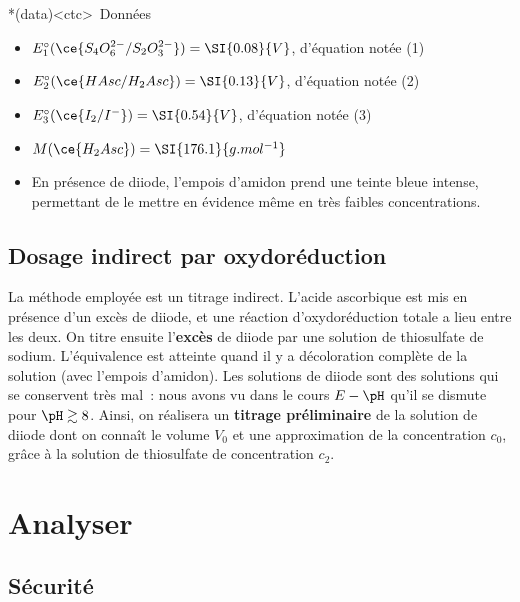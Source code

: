 \documentclass[../main/main.tex]{subfiles}
\begin{document}
{	\begin{tcb}*(data)<ctc>{\icondata~Données}
		\begin{itemize}
			\item $E_1^\circ (\ce{S_4O_6^{2-}/S_2O_3^{2-}}) = \SI{0.08}{V}$, d'équation
			      notée (1)
			\item $E_2^\circ (\ce{HAsc/H_2Asc}) = \SI{0.13}{V}$, d'équation notée (2)
			\item $E_3^\circ (\ce{I_2/I^{-}}) = \SI{0.54}{V}$, d'équation notée (3)
			\item $M(\ce{H_2Asc}) = \SI{176.1}{g.mol^{-1}}$
			\item En présence de diiode, l'empois d'amidon prend une teinte bleue
			      intense, permettant de le mettre en évidence même en très faibles
			      concentrations.
		\end{itemize}
	\end{tcb}

	\subsection{Dosage indirect par oxydoréduction}
	La méthode employée est un titrage indirect. L'acide ascorbique est mis en
	présence d'un excès  de diiode, et une réaction d'oxydoréduction
	totale a lieu entre les deux. On titre ensuite l'\textbf{excès} de diiode par
	une solution de thiosulfate de sodium. L'équivalence est atteinte quand il y a
	décoloration complète de la solution (avec l'empois d'amidon).
	\bigbreak
	Les solutions de diiode sont des solutions qui se conservent très mal~: nous
	avons vu dans le cours $E-\pH$ qu'il se dismute pour $\pH \gtrsim 8$. Ainsi, on
	réalisera un \textbf{titrage préliminaire} de la solution de diiode dont on
	connaît le volume $V_0$ et une approximation de la concentration $c_0$, grâce à
	la solution de thiosulfate de concentration $c_2$.
}%

\section{Analyser}
\subsection{Sécurité}
\end{document}

